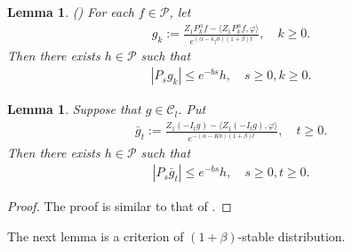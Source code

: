 \documentclass[12pt,a4paper]{amsart}
\theoremstyle{plain}
\newtheorem{lem}[thm]{Lemma}
\theoremstyle{definition}
\numberwithin{equation}{section}
\begin{document}
\begin{lem}\label{lem: control of gk}(\cite[Lemma 2.8]{MM})
    For each $f\in \mathcal{P}$, let
    \begin{align}
        g_k
    := \frac{Z_1 P^{\alpha}_k f-\langle  Z_1P^{\alpha}_k f,\varphi\rangle}{e^{(\alpha-\kappa_f b)(1+\beta)t}},
    \quad k \geq 0.
    \end{align}
    Then there exists $h\in \mathcal{P}$ such that
    \begin{align}
        |P_sg_k|\leq e^{-bs}h,\quad s\geq 0, k \geq 0.
    \end{align}
\end{lem}

\begin{lem}\label{control of gn} Suppose that $g\in \mathcal{C}_l$.
    Put
    \begin{align}
        \bar{g}_t:=\frac{Z_1(-I_tg)-\langle Z_1(-I_tg),\varphi\rangle}{e^{-(\alpha-Kb)(1+\beta)t}},\quad t\geq 0.
    \end{align}
    Then there exists $h\in \mathcal{P}$ such that
    \begin{align}
        |P_s\bar{g}_t|\leq e^{-bs}h,\quad s\geq 0, t\geq 0.
    \end{align}
\end{lem}
\begin{proof}
    The proof  is similar to that of \cite[Lemma 2.8]{MM}.
\end{proof}



The next lemma is a criterion of $(1+\beta)$-stable distribution.
\end{document}
